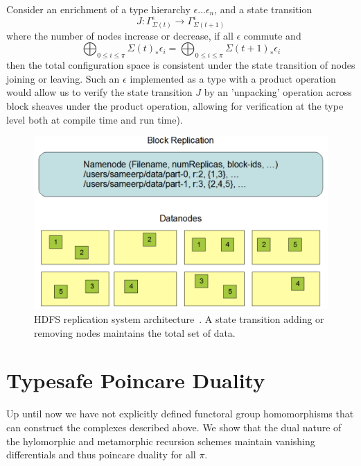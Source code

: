 \documentclass[runningheads]{llncs}
\begin{document}
Consider an enrichment of a type hierarchy $\epsilon \dots \epsilon_{n}$, and a state transition
\begin{equation}
J: \Gamma^\epsilon_{\Sigma(t)} \rightarrow \Gamma^\epsilon_{\Sigma(t + 1)} 
\end{equation}
where the number of nodes increase or decrease, if all $\epsilon$ commute and 
\begin{equation}
\bigoplus_{0 \leq i \leq \pi} \Sigma(t)_* \epsilon_i = \bigoplus_{0 \leq i \leq \pi} \Sigma(t+1)_* \epsilon_i
\end{equation}
then the total configuration space is consistent under the state transition of nodes joining or leaving. Such an $\epsilon$ implemented as a type with a product operation~\cite{ref_url2} would allow us to verify the state transition $J$ by an ’unpacking’ operation across block sheaves under the product operation, allowing for verification at the type level both at compile time and run time). 
\begin{figure}
\includegraphics[width=\textwidth]{HDFS-replication.png}
\caption{HDFS replication system architecture~\cite{ref_url7}. A state transition adding or removing nodes maintains the total set of data.} \label{fig2}
\end{figure}

\section{Typesafe Poincare Duality}
Up until now we have not explicitly defined functoral group homomorphisms that can construct the complexes described above. We show that the dual nature of the hylomorphic and metamorphic recursion schemes maintain vanishing differentials and thus poincare duality for all $\pi$.
\end{document}
